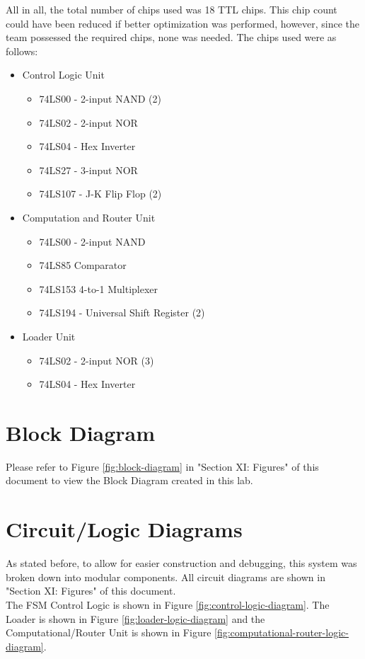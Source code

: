 \documentclass[journal, twocolumn, final,11pt,letterpaper]{IEEEtran}
\begin{document}
All in all, the total number of chips used was 18 TTL chips. This chip count could have been reduced if better optimization was performed, however, since the team possessed the required chips, none was needed. The chips used were as follows:
\begin{itemize}
	\item Control Logic Unit
	\begin{itemize}
		\item 74LS00 - 2-input NAND (2)
		\item 74LS02 - 2-input NOR
		\item74LS04 - Hex Inverter
		\item 74LS27 - 3-input NOR
		\item 74LS107 - J-K Flip Flop (2)
	\end{itemize}
	\item Computation and Router Unit
	\begin{itemize}
		\item 74LS00 - 2-input NAND
		\item 74LS85 Comparator
		\item 74LS153 4-to-1 Multiplexer
		\item 74LS194 - Universal Shift Register (2)
	\end{itemize}
	\item Loader Unit
	\begin{itemize}
		\item 74LS02 - 2-input NOR (3)
		\item 74LS04 - Hex Inverter 
	\end{itemize}
\end{itemize}
\section{Block Diagram} 
Please refer to Figure \ref{fig:block-diagram} in "Section XI: Figures" of this document to view the Block Diagram created in this lab.
 
\section{Circuit/Logic Diagrams}
As stated before, to allow for easier  construction and debugging, this system was broken down into modular components. All circuit diagrams are shown in "Section XI: Figures" of this document.\\
 
The FSM Control Logic is shown in Figure \ref{fig:control-logic-diagram}. The Loader is shown in Figure \ref{fig:loader-logic-diagram} and the Computational/Router Unit is shown in Figure \ref{fig:computational-router-logic-diagram}.   
 
\end{document}
